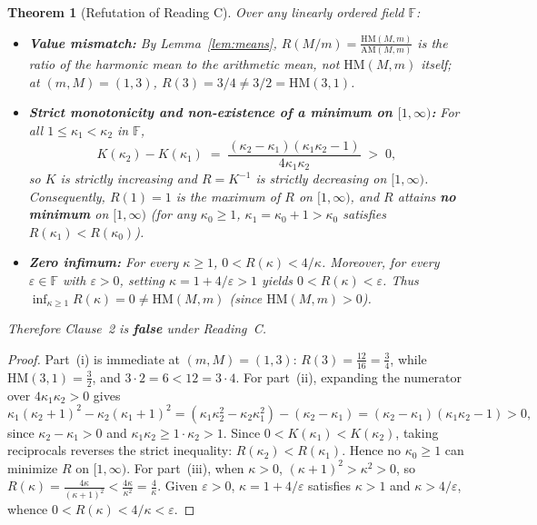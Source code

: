 \documentclass[11pt,a4paper]{article}
\newtheorem{theorem}{Theorem}[section]
\theoremstyle{definition}
\newcommand{\AM}{\mathrm{AM}}
\newcommand{\HM}{\mathrm{HM}}
\begin{document}
\begin{theorem}[Refutation of Reading C]
\label{thm:readingC}
Over any linearly ordered field $\mathbb{F}$:
\begin{itemize}
  \item[(i)] \textbf{Value mismatch:} By Lemma~\ref{lem:means},
  $R(M/m) = \frac{\HM(M,m)}{\AM(M,m)}$ is the \emph{ratio} of the harmonic mean
  to the arithmetic mean, not $\HM(M,m)$ itself; at $(m, M) = (1, 3)$,
  $R(3) = 3/4 \ne 3/2 = \HM(3, 1)$.
  \item[(ii)] \textbf{Strict monotonicity and non-existence of a minimum on $[1, \infty)$:}
  For all $1 \le \kappa_1 < \kappa_2$ in $\mathbb{F}$,
  \begin{equation}
    \label{eq:K-mono}
    K(\kappa_2) - K(\kappa_1)
    \;=\; \frac{(\kappa_2 - \kappa_1)(\kappa_1\kappa_2 - 1)}{4\kappa_1\kappa_2}
    \;>\; 0,
  \end{equation}
  so $K$ is strictly increasing and $R = K^{-1}$ is strictly decreasing on
  $[1, \infty)$. Consequently, $R(1) = 1$ is the \emph{maximum} of $R$ on
  $[1, \infty)$, and $R$ attains \textbf{no minimum} on $[1, \infty)$ (for any
  $\kappa_0 \ge 1$, $\kappa_1 = \kappa_0 + 1 > \kappa_0$ satisfies
  $R(\kappa_1) < R(\kappa_0)$).
  \item[(iii)] \textbf{Zero infimum:} For every $\kappa \ge 1$, $0 < R(\kappa) < 4/\kappa$.
  Moreover, for every $\varepsilon \in \mathbb{F}$ with $\varepsilon > 0$,
  setting $\kappa = 1 + 4/\varepsilon > 1$ yields $0 < R(\kappa) < \varepsilon$.
  Thus $\inf_{\kappa \ge 1} R(\kappa) = 0 \ne \HM(M, m)$ (since $\HM(M, m) > 0$).
\end{itemize}
Therefore Clause~2 is \textbf{false} under Reading~C.
\end{theorem}
\begin{proof}
Part~(i) is immediate at $(m,M) = (1,3)$: $R(3) = \frac{12}{16} = \frac{3}{4}$,
while $\HM(3,1) = \frac{3}{2}$, and $3\cdot 2 = 6 < 12 = 3\cdot 4$. For part~(ii),
expanding the numerator over $4\kappa_1\kappa_2 > 0$ gives
\[
  \kappa_1(\kappa_2 + 1)^2 - \kappa_2(\kappa_1 + 1)^2
  = (\kappa_1\kappa_2^2 - \kappa_2\kappa_1^2) - (\kappa_2 - \kappa_1)
  = (\kappa_2 - \kappa_1)(\kappa_1\kappa_2 - 1) > 0,
\]
since $\kappa_2 - \kappa_1 > 0$ and $\kappa_1\kappa_2 \ge 1 \cdot \kappa_2 > 1$.
Since $0 < K(\kappa_1) < K(\kappa_2)$, taking reciprocals reverses the strict
inequality: $R(\kappa_2) < R(\kappa_1)$. Hence no $\kappa_0 \ge 1$ can minimize
$R$ on $[1, \infty)$. For part~(iii), when $\kappa > 0$,
$(\kappa + 1)^2 > \kappa^2 > 0$, so
$R(\kappa) = \frac{4\kappa}{(\kappa + 1)^2} < \frac{4\kappa}{\kappa^2} = \frac{4}{\kappa}$.
Given $\varepsilon > 0$, $\kappa = 1 + 4/\varepsilon$ satisfies $\kappa > 1$ and
$\kappa > 4/\varepsilon$, whence $0 < R(\kappa) < 4/\kappa < \varepsilon$.
\end{proof}
\end{document}
